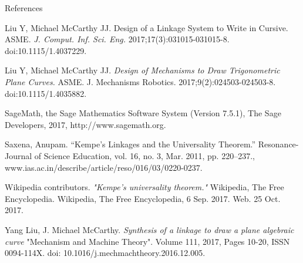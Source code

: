 \documentclass{beamer}
\begin{document}
\begin{frame}{}
\begin{columns}[t]
\begin{column}{0.3\linewidth}
\begin{block}{References}
\begin{thebibliography}{99}

Liu Y, Michael McCarthy JJ. Design of a Linkage System to Write in Cursive. ASME. \emph{J. Comput. Inf. Sci. Eng.} 2017;17(3):031015-031015-8. doi:10.1115/1.4037229.

Liu Y, Michael McCarthy JJ.\emph{ Design of Mechanisms to Draw Trigonometric Plane Curves.} ASME. J. Mechanisms Robotics. 2017;9(2):024503-024503-8. doi:10.1115/1.4035882.  

SageMath, the Sage Mathematics Software System (Version 7.5.1),
   The Sage Developers, 2017, http://www.sagemath.org.
   
Saxena, Anupam. “Kempe's Linkages and the Universality Theorem.” Resonance-Journal of Science Education, vol. 16, no. 3, Mar. 2011, pp. 220–237., www.ias.ac.in/describe/article/reso/016/03/0220-0237.

Wikipedia contributors.\emph{ "Kempe's universality theorem."} Wikipedia, The Free Encyclopedia. Wikipedia, The Free Encyclopedia, 6 Sep. 2017. Web. 25 Oct. 2017.

Yang Liu, J. Michael McCarthy. \emph{ Synthesis of a linkage to draw a plane algebraic curve} "Mechanism and Machine Theory". Volume 111, 2017, Pages 10-20, ISSN 0094-114X. doi: 10.1016/j.mechmachtheory.2016.12.005.


\end{thebibliography}
\end{block}

\end{column}%





\end{columns}
\end{frame}
\end{document}
